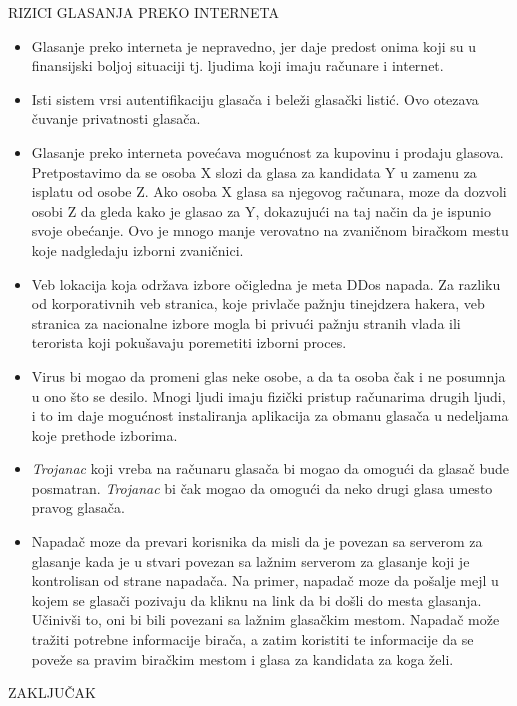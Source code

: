 \documentclass[a4paper]{article}
\begin{document}
{\noindent RIZICI GLASANJA PREKO INTERNETA
\begin{itemize}
\item Glasanje preko interneta je nepravedno, jer daje predost onima koji su u finansijski boljoj situaciji tj. ljudima koji imaju računare i internet.
\item Isti sistem vrsi autentifikaciju glasača i beleži glasački listić. Ovo otezava čuvanje privatnosti glasača.
\item Glasanje preko interneta povećava mogućnost za kupovinu i prodaju glasova. Pretpostavimo da se osoba X slozi da glasa za kandidata Y u zamenu za isplatu od osobe Z. Ako osoba X glasa sa njegovog računara, moze da dozvoli osobi Z da gleda kako je glasao za Y, dokazujući na taj način da je ispunio svoje obećanje. Ovo je mnogo manje verovatno na zvaničnom biračkom mestu koje nadgledaju izborni zvaničnici.
\item Veb lokacija koja održava izbore očigledna je meta DDos napada. Za razliku od korporativnih veb stranica, koje privlače pažnju tinejdzera hakera, veb stranica za nacionalne izbore mogla bi privući pažnju stranih vlada ili terorista koji pokušavaju poremetiti izborni proces.
\item Virus bi mogao da promeni glas neke osobe, a da ta osoba čak i ne posumnja u ono što se desilo. Mnogi ljudi imaju fizički pristup računarima drugih ljudi, i to im daje mogućnost instaliranja aplikacija za obmanu glasača u nedeljama koje prethode izborima.
\item \textit{Trojanac} koji vreba na računaru glasača bi mogao da omogući da glasač bude posmatran. \textit{Trojanac} bi čak mogao da omogući da neko drugi glasa umesto pravog glasača.
\item Napadač moze da prevari korisnika da misli da je povezan sa serverom za glasanje kada je u stvari povezan sa lažnim serverom za glasanje koji je kontrolisan od strane napadača. Na primer, napadač moze da pošalje mejl u kojem se glasači pozivaju da kliknu na link da bi došli do mesta glasanja. Učinivši to, oni bi bili povezani sa lažnim glasačkim mestom. Napadač može tražiti potrebne informacije birača, a zatim koristiti te informacije da se poveže sa pravim biračkim mestom i glasa za kandidata za koga želi.
\end{itemize}

\noindent ZAKLJUČAK

}
\end{document}
